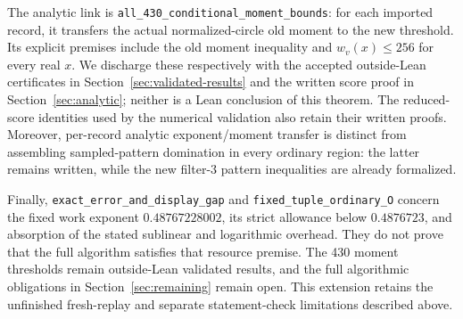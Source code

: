 The analytic link is
\nolinkurl{all_430_conditional_moment_bounds}: for each imported record,
it transfers the actual normalized-circle old moment to the new
threshold. Its explicit premises include the old moment inequality
and $w_v(x)\le256$ for every real $x$. We discharge these respectively
with the accepted outside-Lean certificates in
Section~\ref{sec:validated-results} and the written score proof in
Section~\ref{sec:analytic}; neither is a Lean conclusion of this theorem.
The reduced-score identities used by the numerical validation also
retain their written proofs. Moreover, per-record analytic
exponent/moment transfer is distinct from assembling sampled-pattern
domination in every ordinary region: the latter remains written,
while the new filter-3 pattern inequalities are already formalized.

Finally, \nolinkurl{exact_error_and_display_gap} and
\nolinkurl{fixed_tuple_ordinary_O} concern the fixed work exponent
$0.48767228002$, its strict allowance below $0.4876723$, and absorption
of the stated sublinear and logarithmic overhead. They do not prove
that the full algorithm satisfies that resource premise.
The 430 moment thresholds remain outside-Lean validated results,
and the full algorithmic obligations in Section~\ref{sec:remaining}
remain open. This extension retains the unfinished fresh-replay and
separate statement-check limitations described above.
